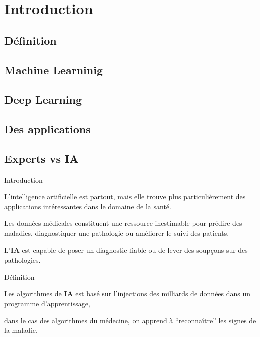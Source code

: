 \section{Introduction}
\subsection{\mybox Définition}
\subsection{\mybox Machine Learninig}
\subsection{\mybox Deep Learning}
\subsection{\mybox Des applications}
\subsection{\mybox Experts  vs IA}

\begin{frame}{Introduction}
    \begin{enumerate}[<+-|alert@+>]
        \myitem
        L'intelligence artificielle est partout, mais elle trouve plus particulièrement
        des applications intéressantes dans le domaine de la santé.

        \myitem
        Les données médicales constituent une ressource inestimable pour prédire des maladies,
        diagnostiquer une pathologie ou améliorer le suivi des patients.

        \myitem
        L'\textbf{IA} est capable de poser un diagnostic fiable ou de lever des soupçons sur des
        pathologies.\mybox
    \end{enumerate}
\end{frame}




\begin{frame}{Définition}
    \begin{itemize}[<+-|alert@+>]
        \myitem
        Les algorithmes de \textbf{IA} est basé sur  l'injections des milliards de données
        dans un programme d'apprentissage,

        \myitem
        dans le cas des algorithmes du médecine, on apprend à ``reconnaître'' les signes
        de la maladie.\mybox
    \end{itemize}

\end{frame}

